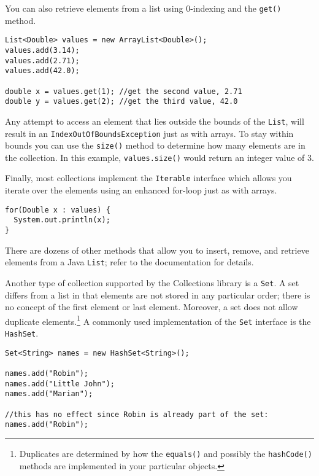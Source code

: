 You can also retrieve elements from a list using 0-indexing and
the \texttt{get()} method. 

\begin{verbatim}
List<Double> values = new ArrayList<Double>();
values.add(3.14);
values.add(2.71);
values.add(42.0);

double x = values.get(1); //get the second value, 2.71
double y = values.get(2); //get the third value, 42.0
\end{verbatim}

Any attempt to access an element that lies outside the bounds of
the \texttt{List}, will
result in an \texttt{IndexOutOfBoundsException} just as 
with arrays.  To stay within bounds you can use the \texttt{size()}
method to determine how many elements are in the collection.
In this example, \texttt{values.size()} would return an 
integer value of 3.

Finally, most collections implement the \texttt{Iterable}
interface which allows you iterate over the elements using an 
enhanced for-loop just as with arrays.

\begin{verbatim}
for(Double x : values) {
  System.out.println(x);
}
\end{verbatim}

There are dozens of other methods that allow you to insert, remove, and
retrieve elements from a Java \texttt{List}; refer to the documentation
for details.

Another type of collection supported by the Collections library is a 
\texttt{Set}.  A set differs from a list in that elements are not
stored in any particular order; there is no concept of the first element
or last element.  Moreover, a set does not allow duplicate elements.\footnote{Duplicates
are determined by how the \texttt{equals()} and possibly the
\texttt{hashCode()} methods are implemented in your particular
objects.}  A commonly used implementation of the \texttt{Set}
interface is the \texttt{HashSet}.  

\begin{verbatim}
Set<String> names = new HashSet<String>();

names.add("Robin");
names.add("Little John");
names.add("Marian");

//this has no effect since Robin is already part of the set:
names.add("Robin");
\end{verbatim}

